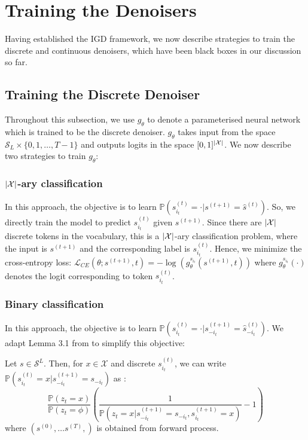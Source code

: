 \section{Training the Denoisers}
\label{sec:training}



Having established the IGD framework, we now describe strategies to train the discrete and continuous denoisers, which have been black boxes in our discussion so far.  

\subsection{Training the Discrete Denoiser}

 Throughout this subsection, we use $g_{\theta}$ to denote a parameterised neural network which is trained to be the discrete denoiser. $g_{\theta}$ takes input from the space $\mathcal{S}_{L} \times \{0, 1, \dots, T-1 \}$ and outputs logits in the space $[0, 1]^{\abs{\mathcal{X}}}$.  We now describe two strategies to train $g_{\theta}$:

\subsubsection{$\abs{\mathcal{X}}$-ary classification}
In this approach, the objective is to learn $\mathbb{P}\left({s}^{(t)}_{i_t} = \cdot | {s}^{(t+1)} = \hat{s}^{(t)} \right)$. So, we directly train the model to predict ${s}^{(t)}_{i_t}$ given ${s}^{(t+1)}$. Since there are $\abs{\mathcal{X}}$ discrete tokens in the vocabulary, this is a $\abs{\mathcal{X}}$-ary classification problem, where the input is ${s}^{(t+1)}$ and the corresponding label is ${s}^{(t)}_{i_t}$. Hence, we minimize the cross-entropy loss: $ \mathcal{L}_{CE}\left(\theta; {s}^{(t+1)}, t \right) = -\log \left( g_{\theta} ^{s_{i_t}} \left({s}^{(t+1)}, t \right) \right)  $
where $g^{s_{i_t}}_{\theta}(\cdot) $ denotes the logit corresponding to token ${s}^{(t)}_{i_t}$.

\subsubsection{Binary classification}
\label{subsec:model_train_binary}
In this approach, the objective is to learn $\mathbb{P}\left({s}^{(t)}_{i_t} = \cdot | {s}^{(t+1)}_{-i_t} = \hat{s}^{(t)}_{-i_t} \right)$. We adapt Lemma 3.1 from \cite{varma2024glauber} to simplify this objective:

\begin{lemma}
Let $s \in \mathcal{S}^L$. Then, for $x \in \mathcal{X}$ and discrete ${s}^{(t)}_{i_t}$, we can write $\mathbb{P}\left({s}^{(t)}_{i_t} = x | {s}^{(t+1)}_{-i_t} = {s}_{-i_t} \right)$ as :
\small
\begin{equation*}
     \frac{\mathbb{P}(z_t = x)}{\mathbb{P}(z_t = \phi)} \left( \frac{1}{\mathbb{P}\left({z_t} = x | {s}^{(t+1)}_{-i_t} = {s}_{-i_t}, {s}^{(t+1)}_{i_t} = x \right)}  - 1 \right)
\end{equation*}
\normalsize
 where $\left(s^{(0)},  \dots s^{(T)}, \right)$ is obtained from forward process.
\end{lemma}


